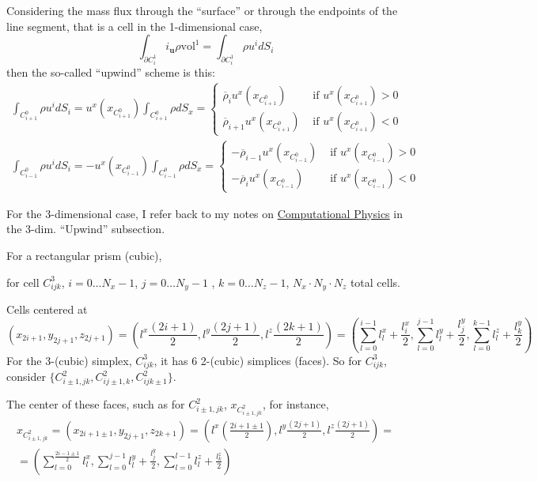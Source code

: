 \documentclass[10pt]{amsart}
\begin{document}
Considering the mass flux through the ``surface'' or through the endpoints of the line segment, that is a cell in the 1-dimensional case,
\[
\int_{\partial C_i^1} i_{\mathbf{u}} \rho \text{vol}^1 = \int_{ \partial C_i^1} \rho u^i dS_i
\]
then the so-called ``upwind'' scheme is this:
\[
\begin{gathered}
  \int_{C^0_{i+1}} \rho u^i dS_i = u^x(x_{C^0_{i+1}}) \int_{C^0_{i+1} } \rho dS_x = \begin{cases} 
    \overline{\rho}_iu^x(x_{C^0_{i+1}} ) & \text{ if } u^x(x_{C^0_{i+1}}) > 0 \\
    \overline{\rho}_{i+1}u^x(x_{C^0_{i+1}} ) & \text{ if } u^x(x_{C^0_{i+1}}) < 0
    \end{cases} \\
  \int_{C^0_{i-1}} \rho u^i dS_i = -u^x(x_{C^0_{i-1}}) \int_{C^0_{i-1} } \rho dS_x = \begin{cases} 
    -\overline{\rho}_{i-1}u^x(x_{C^0_{i-1}} ) & \text{ if } u^x(x_{C^0_{i-1}}) > 0 \\
    -\overline{\rho}_{i}u^x(x_{C^0_{i-1}} ) & \text{ if } u^x(x_{C^0_{i-1}}) < 0
    \end{cases} 
\end{gathered}
\]


For the 3-dimensional case, I refer back to my notes on \href{https://github.com/ernestyalumni/CompPhys/blob/master/LaTeXandpdfs/CompPhys.pdf}{Computational Physics} in the 3-dim. ``Upwind'' subsection. 


For a rectangular prism (cubic),

for cell $C^3_{ijk}$, $i=0 \dots N_x-1$, $j=0 \dots N_y-1$ , $k=0 \dots N_z-1$, $N_x\cdot N_y \cdot N_z$ total cells.

Cells centered at
\[
(x_{2i+1}, y_{2j+1}, z_{2j+1}) = (l^x \frac{ (2i+1)}{2} , l^y \frac{(2j+1)}{2}, l^z \frac{(2k+1)}{2} ) = \left( \sum_{l=0}^{i-1} l_l^x + \frac{l_i^x}{2} , \sum_{l=0}^{j-1}l_l^y + \frac{l_j^y}{2}, \sum_{l=0}^{k-1}l_l^z + \frac{l_k^y}{2}  \right)
\]
For the 3-(cubic) simplex, $C^3_{ijk}$, it has 6 2-(cubic) simplices (faces).  So for $C_{ijk}^3$, consider $\lbrace C^2_{i\pm 1, jk}, C^2_{ij\pm 1,k}, C^2_{ijk\pm 1}\rbrace$.

The center of these faces, such as for $C^2_{i\pm 1, jk}$, $x_{ C^2_{i\pm 1, jk} }$, for instance,
\[
\begin{aligned}
  x_{C^2_{i\pm 1,jk}} = (x_{2i+1\pm 1},y_{2j+1},z_{2k+1}) = (l^x\left( \frac{2i+1\pm 1}{2}\right) , l^y\frac{(2j+1)}{2},  l^z\frac{(2j+1)}{2} ) = \\
  = \left( \sum_{l=0}^{ \frac{2i - 1 \pm 1 }{2} } l_l^x, \sum_{l=0}^{j-1} l_l^y + \frac{l_j^y}{2}, \sum_{l=0}^{l-1} l_l^z + \frac{l_k^z}{2} \right) 
  \end{aligned}
\]
\end{document}
